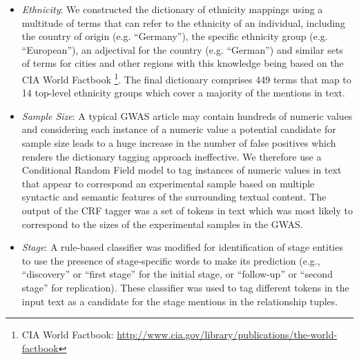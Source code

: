 \begin{itemize}
    \item \emph{Ethnicity}:
    We constructed the dictionary of ethnicity mappings using a multitude of terms that can refer to the ethnicity of an individual, including the country of origin (e.g. ``Germany''), the specific ethnicity group (e.g. ``European''), an adjectival for the country (e.g. ``German'') and similar sets of terms for cities and other regions with this knowledge being based on the CIA World Factbook \footnote{CIA World Factbook: \url{http://www.cia.gov/library/publications/the-world-factbook}}. The final dictionary comprises 449 terms that map to 14 top-level ethnicity groups which cover a majority of the mentions in text.
    
    \item \emph{Sample Size}:
    A typical GWAS article may contain hundreds of numeric values and considering each instance of a numeric value a potential candidate for sample size leads to a huge increase in the number of false positives which renders the dictionary tagging approach ineffective.  We therefore use a Conditional Random Field model to tag instances of numeric values in text that appear to correspond an experimental sample based on multiple syntactic and semantic features of the surrounding textual content. The output of the CRF tagger was a set of tokens in text which was most likely to correspond to the sizes of the experimental samples in the GWAS.
    
    \item \emph{Stage}:
    A rule-based classifier was modified for identification of stage entities to use the presence of stage-specific words to make its prediction (e.g., ``discovery'' or ``first stage'' for the initial stage, or ``follow-up'' or ``second stage'' for replication). These classifier was used to tag different tokens in the input text as a candidate for the stage mentions in the relationship tuples.
 \end{itemize}

